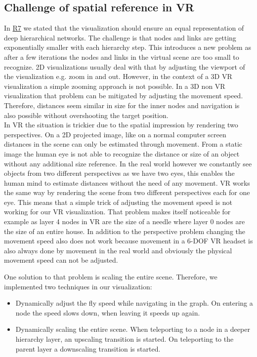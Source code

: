 \subsection{Challenge of spatial reference in VR}
\label{chap:ps-spatialReference}
In \hyperref[req:R7]{R7} we stated that the visualization should ensure an equal representation of deep hierarchical networks. The challenge is that nodes and links are getting exponentially smaller with each hierarchy step.
This introduces a new problem as after a few iterations the nodes and links in the virtual scene are too small to recognize.
2D visualizations usually deal with that by adjusting the viewport of the visualization e.g. zoom in and out. 
However, in the context of a 3D VR visualization a simple zooming approach is not possible. 
In a 3D non VR visualization that problem can be mitigated by adjusting the movement speed. Therefore, distances seem similar in size for the inner nodes and navigation is also possible without overshooting the target position.\\ 
In VR the situation is trickier due to the spatial impression by rendering two perspectives. On a 2D projected image, like on a normal computer screen distances in the scene can only be estimated through movement. From a static image the human eye is not able to recognize the distance or size of an object without any additional size reference. 
In the real world however we constantly see objects from two different perspectives as we have two eyes, this enables the human mind to estimate distances without the need of any movement. VR works the same way by rendering the scene from two different perspectives each for one eye.  
This means that a simple trick of adjusting the movement speed is not working for our VR visualization.
That problem makes itself noticeable for example as layer 4 nodes in VR are the size of a needle where layer 0 nodes are the size of an entire house.
In addition to the perspective problem changing the movement speed also does not work because movement in a 6-DOF VR headset is also always done by movement in the real world and obviously the physical movement speed can not be adjusted.

One solution to that problem is scaling the entire scene. Therefore, we implemented two techniques in our visualization:
\begin{itemize}
    \item Dynamically adjust the fly speed while navigating in the graph. On entering a node the speed slows down, when leaving it speeds up again. 
    \item Dynamically scaling the entire scene. When teleporting to a node in a deeper hierarchy layer, an upscaling transition is started. On teleporting to the parent layer a downscaling transition is started. 
\end{itemize} 

